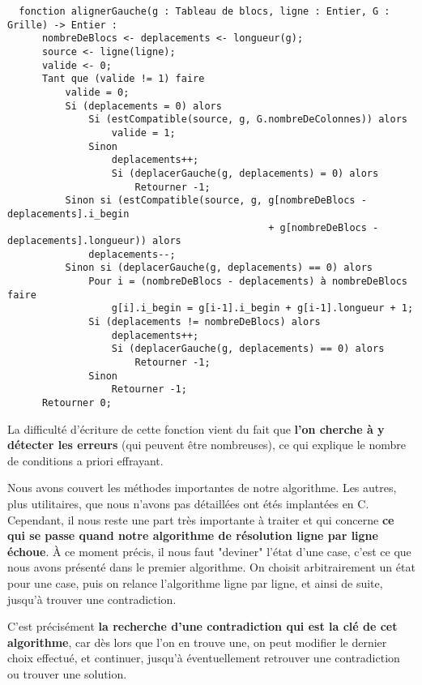 \documentclass{report}
\begin{document}
\begin{verbatim}
  fonction alignerGauche(g : Tableau de blocs, ligne : Entier, G : Grille) -> Entier :
      nombreDeBlocs <- deplacements <- longueur(g);
      source <- ligne(ligne);
      valide <- 0;
      Tant que (valide != 1) faire
          valide = 0;
          Si (deplacements = 0) alors
              Si (estCompatible(source, g, G.nombreDeColonnes)) alors
                  valide = 1;
              Sinon
                  deplacements++;
                  Si (deplacerGauche(g, deplacements) = 0) alors
                      Retourner -1;
          Sinon si (estCompatible(source, g, g[nombreDeBlocs - deplacements].i_begin
                                             + g[nombreDeBlocs - deplacements].longueur)) alors
              deplacements--;
          Sinon si (deplacerGauche(g, deplacements) == 0) alors
              Pour i = (nombreDeBlocs - deplacements) à nombreDeBlocs faire
                  g[i].i_begin = g[i-1].i_begin + g[i-1].longueur + 1;
              Si (deplacements != nombreDeBlocs) alors
                  deplacements++;
                  Si (deplacerGauche(g, deplacements) == 0) alors
                      Retourner -1;
              Sinon
                  Retourner -1;
      Retourner 0;
\end{verbatim}

La difficulté d'écriture de cette fonction vient du fait que \textbf{l'on cherche à y détecter les erreurs} (qui peuvent être nombreuses), ce qui explique le nombre de conditions a priori effrayant.

\vspace{20pt}

Nous avons couvert les méthodes importantes de notre algorithme. Les autres, plus utilitaires, que nous n'avons pas détaillées ont étés implantées en C. Cependant, il nous reste une part très importante à traiter et qui concerne \textbf{ce qui se passe quand notre algorithme de résolution ligne par ligne échoue}. À ce moment précis, il nous faut "deviner" l'état d'une case, c'est ce que nous avons présenté dans le premier algorithme. On choisit arbitrairement un état pour une case, puis on relance l'algorithme ligne par ligne, et ainsi de suite, jusqu'à trouver une contradiction.

C'est précisément \textbf{la recherche d'une contradiction qui est la clé de cet algorithme}, car dès lors que l'on en trouve une, on peut modifier le dernier choix effectué, et continuer, jusqu'à éventuellement retrouver une contradiction ou trouver une solution.
\end{document}
